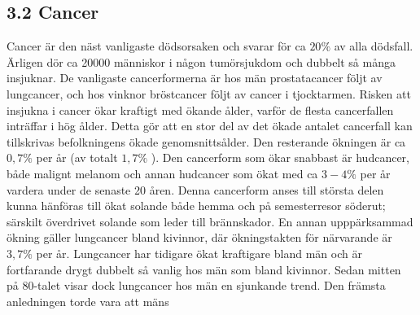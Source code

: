 \subsection*{3.2 Cancer}
Cancer är den näst vanligaste dödsorsaken och svarar för ca \(20 \%\) av alla dödsfall. Ärligen dör ca 20000 människor i någon tumörsjukdom och dubbelt så många insjuknar. De vanligaste cancerformerna är hos män prostatacancer följt av lungcancer, och hos vinknor bröstcancer följt av cancer i tjocktarmen. Risken att insjukna i cancer ökar kraftigt med ökande ålder, varför de flesta cancerfallen inträffar i hög ålder. Detta gör att en stor del av det ökade antalet cancerfall kan tillskrivas befolkningens ökade genomsnittsålder. Den resterande ökningen är ca \(0,7 \%\) per år (av totalt \(1,7 \%\) ).
Den cancerform som ökar snabbast är hudcancer, både malignt melanom och annan hudcancer som ökat med ca \(3-4 \%\) per år vardera under de senaste 20 åren. Denna cancerform anses till största delen kunna hänföras till ökat solande både hemma och på semesterresor söderut; särskilt överdrivet solande som leder till brännskador.
En annan upppärksammad ökning gäller lungcancer bland kivinnor, där ökningstakten för närvarande är \(3,7 \%\) per år. Lungcancer har tidigare ökat kraftigare bland män och är fortfarande drygt dubbelt så vanlig hos män som bland kivinnor. Sedan mitten på 80-talet visar dock lungcancer hos män en sjunkande trend. Den främsta anledningen torde vara att mäns

